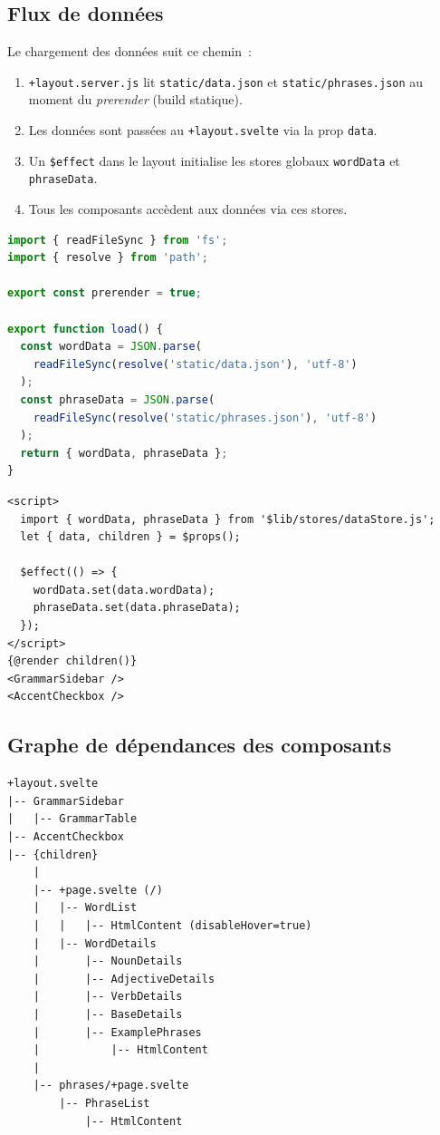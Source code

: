 \subsection{Flux de données}

Le chargement des données suit ce chemin~:

\begin{enumerate}
  \item \texttt{+layout.server.js} lit \texttt{static/data.json} et \texttt{static/phrases.json} au moment du \emph{prerender} (build statique).
  \item Les données sont passées au \texttt{+layout.svelte} via la prop \texttt{data}.
  \item Un \texttt{\$effect} dans le layout initialise les stores globaux \texttt{wordData} et \texttt{phraseData}.
  \item Tous les composants accèdent aux données via ces stores.
\end{enumerate}

\begin{lstlisting}[language=javascript, title=+layout.server.js --- chargement des donnees]
import { readFileSync } from 'fs';
import { resolve } from 'path';

export const prerender = true;

export function load() {
  const wordData = JSON.parse(
    readFileSync(resolve('static/data.json'), 'utf-8')
  );
  const phraseData = JSON.parse(
    readFileSync(resolve('static/phrases.json'), 'utf-8')
  );
  return { wordData, phraseData };
}
\end{lstlisting}

\begin{lstlisting}[language=svelte, title=+layout.svelte --- initialisation des stores]
<script>
  import { wordData, phraseData } from '$lib/stores/dataStore.js';
  let { data, children } = $props();

  $effect(() => {
    wordData.set(data.wordData);
    phraseData.set(data.phraseData);
  });
</script>
{@render children()}
<GrammarSidebar />
<AccentCheckbox />
\end{lstlisting}

\subsection{Graphe de dépendances des composants}

\begin{lstlisting}[title=Arbre des composants]
+layout.svelte
|-- GrammarSidebar
|   |-- GrammarTable
|-- AccentCheckbox
|-- {children}
    |
    |-- +page.svelte (/)
    |   |-- WordList
    |   |   |-- HtmlContent (disableHover=true)
    |   |-- WordDetails
    |       |-- NounDetails
    |       |-- AdjectiveDetails
    |       |-- VerbDetails
    |       |-- BaseDetails
    |       |-- ExamplePhrases
    |           |-- HtmlContent
    |
    |-- phrases/+page.svelte
        |-- PhraseList
            |-- HtmlContent
\end{lstlisting}


